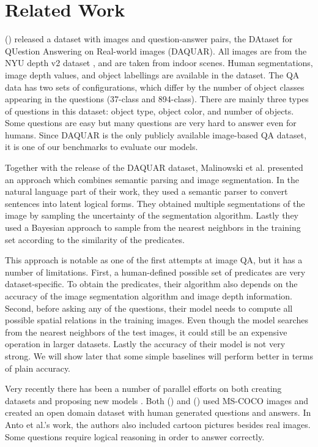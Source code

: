 \documentclass{article}
\renewcommand{\#}[1]{\textbf{#1}}
\newcommand{\shortcite}[1]{\citeauthor{#1} (\citeyear{#1})}
\begin{document}
\section{Related Work}
\shortcite{malinowski14a} released a dataset with images and question-answer
pairs, the DAtaset for QUestion Answering on Real-world images (DAQUAR). All
images are from the NYU depth v2 dataset \cite{silberman12}, and are taken
from indoor scenes. Human segmentations, image depth values, and object
labellings are available in the dataset. The QA data has two sets of
configurations, which differ by the number of object classes appearing 
in the questions (37-class and 894-class). There are mainly three types 
of questions in this dataset: object  type, object color, and number of objects. 
Some questions are easy but many questions are very hard to answer even for humans. 
Since DAQUAR is the only publicly available image-based QA dataset, 
it is one of our benchmarks to evaluate our models.

Together with the release of the DAQUAR dataset, Malinowski et al. presented 
an approach which combines semantic parsing and image segmentation. In the natural 
language part of their work, they used a semantic parser \cite{liang13} to convert 
sentences into latent logical forms. They obtained multiple segmentations of the 
image by sampling the uncertainty of the segmentation algorithm. Lastly they used 
a Bayesian approach to sample from the nearest neighbors in the 
training set according to the similarity of the predicates.

This approach is notable as one of the first attempts at image QA, 
but it has a number of limitations. First, a human-defined possible 
set of predicates are very dataset-specific. To obtain the 
predicates, their algorithm also depends on the accuracy of the image 
segmentation algorithm and image depth information. Second, before 
asking any of the questions, their model needs to compute all possible 
spatial relations in the training images. Even though the model 
searches from the nearest neighbors of the test images, it 
could still be an expensive 
operation in larger datasets. Lastly the accuracy of their model is 
not very strong. We will show later that some simple baselines will 
perform better in terms of plain accuracy.

Very recently there has been a number of parallel efforts on both 
creating datasets and proposing new models 
\cite{antol14, malinowski15, gao15, ma15}. Both \shortcite{antol14} and
\shortcite{gao15} used MS-COCO \cite{mscoco} images and created an 
open domain dataset with human generated questions and answers. In 
Anto et al.'s work, the authors also included cartoon pictures 
besides real images. Some questions require logical reasoning 
in order to answer correctly.
\end{document}
